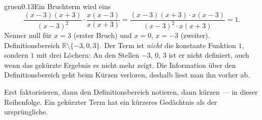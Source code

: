 \begin{loesungkarte}{gruen}{0.13}{Ein Bruchterm wird eins}
\[ \frac{(x - 3)(x + 3)}{(x - 3)^{2}}\cdot\frac{x(x - 3)}{x(x + 3)} = \frac{(x - 3)(x + 3)\cdot x(x - 3)}{(x - 3)^{2}\cdot x(x + 3)} = 1 . \]
Nenner null für $x = 3$ (erster Bruch) und $x = 0$, $x = -3$ (zweiter). Definitionsbereich $\mathbb R\setminus\{-3, 0, 3\}$. Der Term ist \emph{nicht} die konstante Funktion $1$, sondern $1$ mit drei Löchern: An den Stellen $-3$, $0$, $3$ ist er nicht definiert, auch wenn das gekürzte Ergebnis es nicht mehr zeigt. Die Information über den Definitionsbereich geht beim Kürzen verloren, deshalb liest man ihn vorher ab.
\begin{mitnehmen}\kastentext
Erst faktorisieren, dann den Definitionsbereich notieren, dann kürzen --- in dieser Reihenfolge. Ein gekürzter Term hat ein kürzeres Gedächtnis als der ursprüngliche.
\end{mitnehmen}
\end{loesungkarte}

